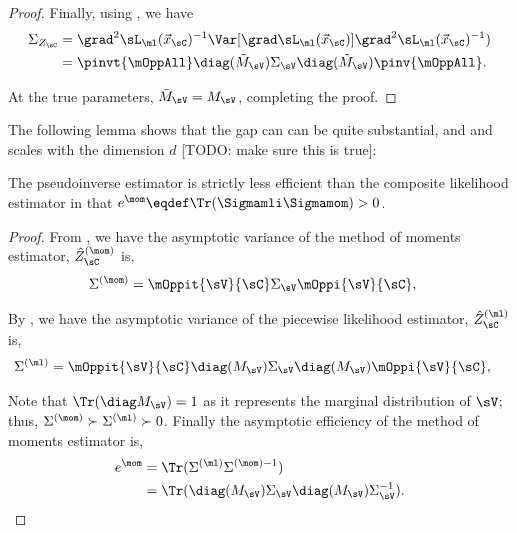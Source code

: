 \begin{proof}
  Finally, using , we have
  \begin{align*}
    \Sigma_{Z_\sC} 
      &= \grad^2 \sL_\ml(\vec x_\sC)^{-1} \Var [\grad \sL_\ml(\vec x_\sC)] \grad^2 \sL_\ml(\vec x_\sC)^{-1}) \\
      &= \pinvt{\mOppAll} \diag(\tilde M_\sV) \Sigma_\sV \diag(\tilde M_\sV) \pinv{\mOppAll}.
  \end{align*}

  At the true parameters, $\tilde M_\sV = M_\sV$, completing the proof.
\end{proof}


The following lemma shows that the gap can  can be quite substantial,
and and scales with the dimension $d$ [TODO: make sure this is true]:
\begin{corollary}
The pseudoinverse estimator is strictly less efficient
than the composite likelihood estimator in that $e^\mom \eqdef \Tr(\Sigmamli \Sigmamom) > 0$.
\end{corollary}
\begin{proof}
  From , we have the asymptotic variance of the method of moments estimator, $\hat Z_\sC^{(\mom)}$ is,
  \begin{align*}
    \Sigma^{(\mom)} &= \mOppit{\sV}{\sC} \Sigma_\sV \mOppi{\sV}{\sC},
  \end{align*}

  By , we have the asymptotic variance of the piecewise likelihood estimator, $\hat Z_\sC^{(\ml)}$ is,
  \begin{align*}
    \Sigma^{(\ml)} &= \mOppit{\sV}{\sC} \diag(M_\sV) \Sigma_\sV \diag(M_\sV) \mOppi{\sV}{\sC},
  \end{align*}

  Note that $\Tr(\diag M_\sV) = 1$ as it represents the marginal
  distribution of $\sV$; thus, $\Sigma^{(\mom)} \succ \Sigma^{(\ml)}
  \succ 0$.  Finally the asymptotic efficiency of the method of moments
  estimator is, 
  \begin{align*}
    e^\mom &= \Tr( \Sigma^{(\ml)}\Sigma^{(\mom) -1} )  \\
           &= \Tr( \diag(M_\sV) \Sigma_\sV \diag(M_\sV) \Sigma_\sV^{-1} ).
  \end{align*}
\end{proof}


